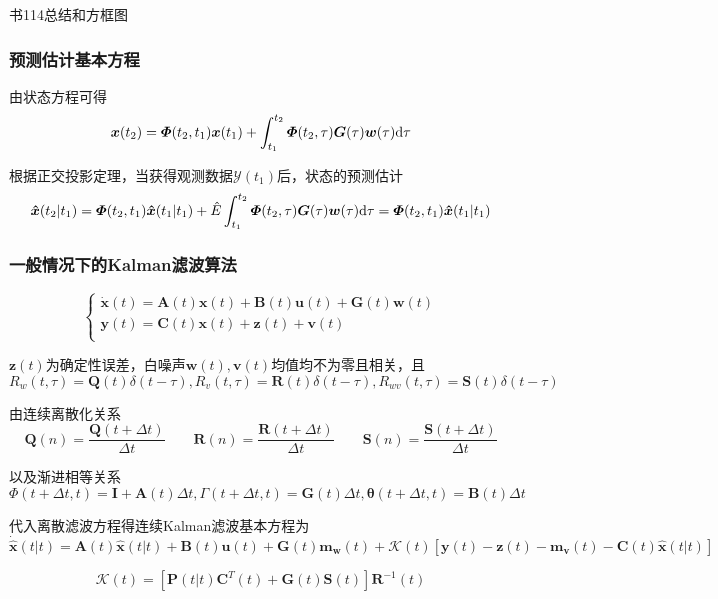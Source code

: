 \documentclass[11pt,a4paper]{ctexart}
\renewcommand{\d}{{\rm d}}
\begin{document}
            书114总结和方框图

        \subsubsection{预测估计基本方程}
            由状态方程可得
            \[
            \bm x(t_2)=\bm\varPhi(t_2,t_1)\bm x(t_1)+\int_{t_1}^{t_2}\bm\varPhi(t_2,\tau)\bm G(\tau)\bm w(\tau)\d\tau
            \]

            根据正交投影定理，当获得观测数据$\mathscr{Y}(t_1)$后，状态的预测估计
            \[
            \bm{\hat x}(t_2|t_1)=\bm\varPhi(t_2,t_1)\bm{\hat x}(t_1|t_1)+\hat E\int_{t_1}^{t_2}\bm\varPhi(t_2,\tau)\bm G(\tau)\bm w(\tau)\d\tau=\bm\varPhi(t_2,t_1)\bm{\hat x}(t_1|t_1)
            \]
        \subsubsection{一般情况下的Kalman滤波算法}
            \[\begin{cases}
            \bm{\dot x}(t)=\bm{A}(t)\bm{x}(t)+\bm{B}(t)\bm{u}(t)+\bm{G}(t)\bm{w}(t)\\
            \bm{y}(t)=\bm{C}(t)\bm{x}(t)+\bm{z}(t)+\bm{v}(t)\\
            \end{cases}\]

            $\bm z(t)$为确定性误差，白噪声$\bm w(t),\bm v(t)$均值均不为零且相关，且
            \[
            R_w(t,\tau)=\bm Q(t)\delta(t-\tau),R_v(t,\tau)=\bm R(t)\delta(t-\tau),R_{wv}(t,\tau)=\bm S(t)\delta(t-\tau)
            \]
            
            由连续离散化关系
            \[
            \bm Q(n)=\frac{\bm Q(t+\Delta t)}{\Delta t}\qquad\bm R(n)=\frac{\bm R(t+\Delta t)}{\Delta t}\qquad\bm S(n)=\frac{\bm S(t+\Delta t)}{\Delta t}
            \]

            以及渐进相等关系
            \[
            \bm\varPhi(t+\Delta t,t)=\bm I+\bm A(t)\Delta t,\bm\varGamma(t+\Delta t,t)=\bm G(t)\Delta t,\bm\theta(t+\Delta t,t)=\bm B(t)\Delta t
            \]

            代入离散滤波方程得连续Kalman滤波基本方程为
            \[
            \bm{\dot{\hat x}}(t|t)=\bm A(t)\bm{\hat x}(t|t)+\bm B(t)\bm u(t)+\bm G(t)\bm{m_w}(t)+\mathscr{K}(t)[\bm y(t)-\bm z(t)-\bm{m_v}(t)-\bm C(t)\bm{\hat x}(t|t)]
            \]

            \[
            \mathscr{K}(t)=[\bm{P}(t|t)\bm C^T(t)+\bm G(t)\bm S(t)]\bm R^{-1}(t)
            \]
            
\end{document}
